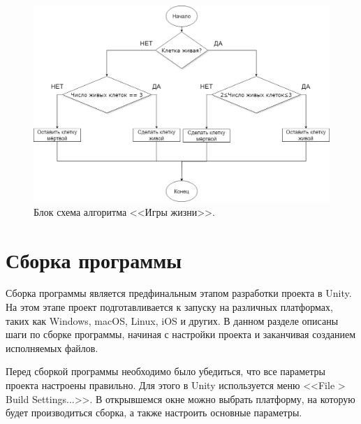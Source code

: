 \begin{figure}[H]
	\centering
	\includegraphics[width=1\textwidth]{images/БлокСхема.png}  
	\caption{Блок схема алгоритма <<Игры жизни>>.}
	\label{fig4}
\end{figure}

\section{\label{sec:ch02/sec01/sub05}Сборка программы}

Сборка программы является предфинальным этапом разработки проекта в Unity. На этом этапе проект подготавливается к запуску на различных платформах, таких как Windows, macOS, Linux, iOS и других. В данном разделе описаны шаги по сборке программы, начиная с настройки проекта и заканчивая созданием исполняемых файлов.

Перед сборкой программы необходимо было убедиться, что все параметры проекта настроены правильно. Для этого в Unity используется меню <<File > Build Settings...>>. В открывшемся окне можно выбрать платформу, на которую будет производиться сборка, а также настроить основные параметры.

